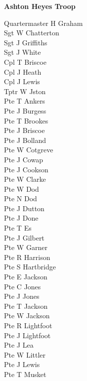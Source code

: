 \vspace*{10mm}

\begin{center}
  \Large
  \textbf{Ashton Heyes Troop}
\end{center}

\vspace*{10mm}

\begin{multicols}{3}
  \small
  \noindent
  Quartermaster H Graham \\
  Sgt W Chatterton \\
  Sgt J Griffiths \\
  Sgt J White \\
  Cpl T Briscoe \\
  Cpl J Heath \\
  Cpl J Lewis \\
  Tptr W Jston \\
  Pte T Ankers \\
  Pte J Burgess \\
  Pte T Brookes \\
  Pte J Briscoe \\
  Pte J Bolland \\
  Pte W Cotgreve \\
  Pte J Cowap \\
  Pte J Cookson \\
  Pte W Clarke \\
  Pte W Dod \\
  Pte N Dod \\
  Pte J Dutton \\
  Pte J Done \\
  Pte T Es \\
  Pte J Gilbert \\
  Pte W Garner \\
  Pte R Harrison \\
  Pte S Hartbridge \\
  Pte E Jackson \\
  Pte C Jones \\
  Pte J Jones \\
  Pte T Jackson \\
  Pte W Jackson \\
  Pte R Lightfoot \\
  Pte J Lightfoot \\
  Pte J Lea \\
  Pte W Littler \\
  Pte J Lewis \\
  Pte T Musket \\

\end{multicols}
